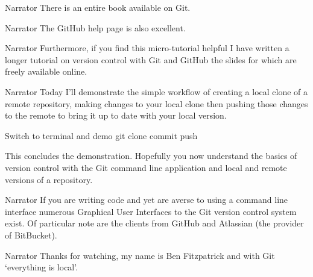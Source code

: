 \documentclass{screenplay} %
\begin{document}
\begin{dialogue}{Narrator} 
There is an entire book available on Git.
\end{dialogue}

\begin{dialogue}{Narrator} 
The GitHub help page is also excellent.
\end{dialogue}

\begin{dialogue}{Narrator} 
Furthermore, if you find this micro-tutorial helpful I have written a longer tutorial on version control with Git and GitHub the slides for which are freely available online.
\end{dialogue}

\begin{dialogue}{Narrator} 
Today I'll demonstrate the simple workflow of creating a local clone of a remote repository, making changes to your local clone then pushing those changes to the remote to bring it up to date with your local version.
\end{dialogue}

Switch to terminal and demo git clone commit push

\begin{dialogue}
This concludes the demonstration.
\newline
\newline
Hopefully you now understand the basics of version control with the Git command line application and local and remote versions of a repository. %
\end{dialogue}

\begin{dialogue}{Narrator}
If you are writing code and yet are averse to using a command line interface numerous Graphical User Interfaces to the Git version control system exist.
\newline
\newline
Of particular note are the clients from GitHub and Atlassian (the provider of BitBucket).
\end{dialogue}

\begin{dialogue}{Narrator}
Thanks for watching, my name is Ben Fitzpatrick and with Git `everything is local'.
\end{dialogue}
\end{document}
